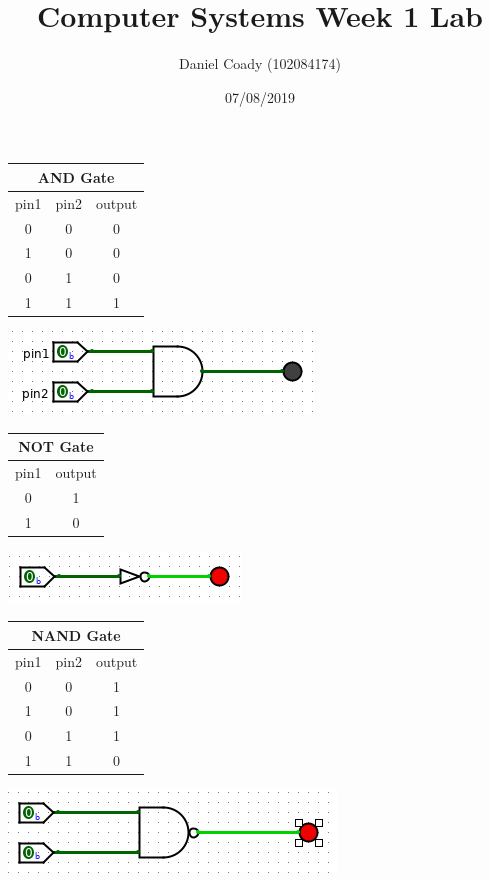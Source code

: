 \documentclass[12pt]{article}
\title{Computer Systems Week 1 Lab}
\author{Daniel Coady (102084174)}
\date{07/08/2019}
\begin{document}
\sffamily

\maketitle

\begin{center}
    \begin{tabular}{|c|c|c|}
        \hline
        \multicolumn{3}{|c|}{AND Gate} \\
        \hline
        pin1 & pin2 & output \\
        \hline\hline
        0 & 0 & 0 \\
        \hline
        1 & 0 & 0 \\
        \hline
        0 & 1 & 0 \\
        \hline
        1 & 1 & 1 \\
        \hline
    \end{tabular}
\end{center}
\centering\includegraphics{images/andgate.png}

\begin{center}
    \begin{tabular}{|c|c|}
        \hline
        \multicolumn{2}{|c|}{NOT Gate} \\
        \hline
        pin1 & output \\
        \hline\hline
        0 & 1 \\
        \hline
        1 & 0 \\
        \hline
    \end{tabular}
\end{center}
\centering\includegraphics{images/notgate.png}

\begin{center}
    \begin{tabular}{|c|c|c|}
        \hline
        \multicolumn{3}{|c|}{NAND Gate} \\
        \hline
        pin1 & pin2 & output \\
        \hline\hline
        0 & 0 & 1 \\
        \hline
        1 & 0 & 1 \\
        \hline
        0 & 1 & 1 \\
        \hline
        1 & 1 & 0 \\
        \hline
    \end{tabular}
\end{center}
\centering\includegraphics[scale=0.5]{images/nandgate.png}
\end{document}
